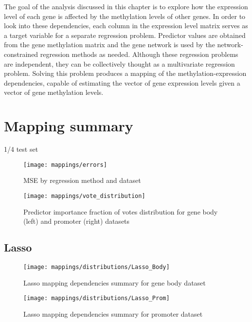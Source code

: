 The goal of the analysis discussed in this chapter is to explore how the expression level of each gene is affected by the methylation levels of other genes. In order to look into these dependencies, each column in the expression level matrix serves as a target variable for a separate regression problem. Predictor values are obtained from the gene methylation matrix and the gene network is used by the network-constrained regression methods as needed. Although these regression problems are independent, they can be collectively thought as a multivariate regression problem. Solving this problem produces a mapping of the methylation-expression dependencies, capable of estimating the vector of gene expression levels given a vector of gene methylation levels. 

\pagebreak
\section{Mapping summary}
1/4 test set


\begin{figure}[H]
	\centering
	\texttt{[image: mappings/errors]}
	\caption{MSE by regression method and dataset}
	\label{fig:map_errors}
\end{figure}

\pagebreak

\begin{figure}[H]
	\centering
	\texttt{[image: mappings/vote\_distribution]}
	\caption{Predictor importance fraction of votes distribution for gene body (left) and promoter (right) datasets}
	\label{fig:map_vote_dist}
\end{figure}


\pagebreak
\subsection{Lasso}

\begin{figure}[H]
	\centering
	\texttt{[image: mappings/distributions/Lasso\_Body]}
	\caption{Lasso mapping dependencies summary for gene body dataset}
	\label{fig:map_body_lasso}
\end{figure}

\begin{figure}[H]
	\centering
	\texttt{[image: mappings/distributions/Lasso\_Prom]}
	\caption{Lasso mapping dependencies summary for promoter dataset}
	\label{fig:map_prom_lasso}
\end{figure}


